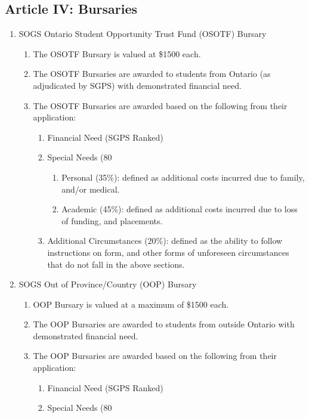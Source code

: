\subsection{Article IV: Bursaries}
\begin{enumerate}[label*=\arabic*., align=left]	
\item SOGS Ontario Student Opportunity Trust Fund (OSOTF) Bursary
\begin{enumerate}[label*=\arabic*., align=left]	
\item The OSOTF Bursary is valued at \$1500 each. 
\item The OSOTF Bursaries are awarded to students from Ontario (as adjudicated by SGPS) with demonstrated financial need.
\item The OSOTF Bursaries are awarded based on the following from their application:
\begin{enumerate}[label*=\arabic*., align=left]
\item Financial Need (SGPS Ranked)
\item Special Needs (80%
\begin{enumerate}[label*=\arabic*., align=left]
\item Personal (35\%): defined as additional costs incurred due to family, and/or medical.
\item Academic (45\%): defined as additional costs incurred due to loss of funding, and placements.
\end{enumerate}
\item Additional Circumstances (20\%): defined as the ability to follow instructions on form, and other forms of unforeseen circumstances that do not fall in the above sections.
\end{enumerate}
\end{enumerate}
\item SOGS Out of Province/Country (OOP) Bursary
\begin{enumerate}[label*=\arabic*., align=left]
\item OOP Bursary is valued at a maximum of \$1500 each. 
\item The OOP Bursaries are awarded to students from outside Ontario with demonstrated financial need.
\item The OOP Bursaries are awarded based on the following from their application:
\begin{enumerate}[label*=\arabic*., align=left]
\item Financial Need (SGPS Ranked)
\item Special Needs (80%

\end{enumerate}
\end{enumerate}
\end{enumerate}
